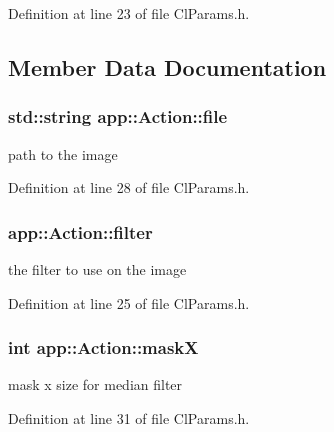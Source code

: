 Definition at line 23 of file Cl\+Params.\+h.



\subsection{Member Data Documentation}
\hypertarget{structapp_1_1_action_a5278227adf8f3e350617892aea5b81ef}{}
\subsubsection[{file}]{\setlength{\rightskip}{0pt plus 5cm}std\+::string app\+::\+Action\+::file}\label{structapp_1_1_action_a5278227adf8f3e350617892aea5b81ef}


path to the image 



Definition at line 28 of file Cl\+Params.\+h.

\hypertarget{structapp_1_1_action_a6c59528c4901062a44724baaec110863}{}
\subsubsection[{filter}]{ app\+::\+Action\+::filter}\label{structapp_1_1_action_a6c59528c4901062a44724baaec110863}


the filter to use on the image 



Definition at line 25 of file Cl\+Params.\+h.

\hypertarget{structapp_1_1_action_a230679b65de36e25f6ad0a4775cea934}{}
\subsubsection[{mask\+X}]{\setlength{\rightskip}{0pt plus 5cm}int app\+::\+Action\+::mask\+X}\label{structapp_1_1_action_a230679b65de36e25f6ad0a4775cea934}


mask x size for median filter 



Definition at line 31 of file Cl\+Params.\+h.

\hypertarget{structapp_1_1_action_afe83b5f2be56b2282be6f81e0c2d6e28}{}
